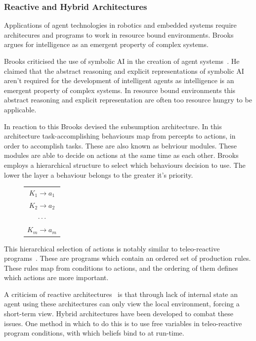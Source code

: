 \documentclass[]{final_report}
\begin{document}
\subsubsection{Reactive and Hybrid Architectures}
Applications of agent technologies in robotics and embedded systems require architecures and programs to work in resource bound environments. Brooks~\cite{brooks1991intelligence} argues for intelligence as an emergent property of complex systems.\par
Brooks criticised the use of symbolic AI in the creation of agent systems~\cite{brooks1991intelligence}. He claimed that the abstract reasoning and explicit representations of symbolic AI aren't required for the development of intelligent agents as intelligence is an emergent property of complex systems. In resource bound environments this abstract reasoning and explicit representation are often too resource hungry to be applicable.\par
In reaction to this Brooks devised the subsumption architecture. In this architecture task-accomplishing behaviours map from percepts to actions, in order to accomplish tasks. These are also known as behviour modules. These modules are able to decide on actions at the same time as each other. Brooks employs a hierarchical structure to select which behaviours decision to use. The lower the layer a behaviour belongs to the greater it's priority.\par 
\begin{figure}
\vspace{-20pt}
\begin{framed}
	\begin{center}
		\begin{tabular}{c}
		$K_1 \rightarrow a_1$\\
		$K_2 \rightarrow a_2$\\
		$\cdot \cdot \cdot$\\
		$K_m \rightarrow a_m$
		\end{tabular}
		\label{tab:trrules}
	\end{center}	
\end{framed}
\vspace{-30pt}
\end{figure}
This hierarchical selection of actions is notably similar to teleo-reactive programs~\cite{nilsson1993teleo}. These are programs which contain an ordered set of production rules. These rules map from conditions to actions, and the ordering of them defines which actions are more important.\par 
A criticism of reactive architectures~\cite{wooldridge2009introduction} is that through lack of internal state an agent using these architectures can only view the local environment, forcing a short-term view. Hybrid architectures have been developed to combat these issues. One method in which to do this is to use free variables in teleo-reactive program conditions, with which beliefs bind to at run-time.
\end{document}
